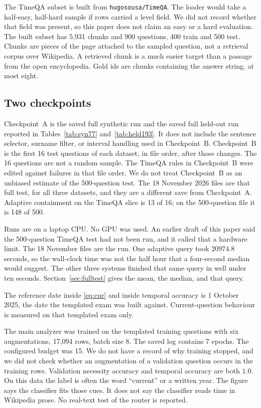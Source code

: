 \documentclass[11pt,letterpaper]{article}
\begin{document}
The TimeQA subset is built from \texttt{hugosousa/TimeQA}.
The loader would take a half-easy, half-hard sample if rows carried a level field.
We did not record whether that field was present, so this paper does not claim an easy or a hard evaluation.
The built subset has 5{,}931 chunks and 900 questions, 400 train and 500 test.
Chunks are pieces of the page attached to the sampled question, not a retrieval corpus over Wikipedia.
A retrieved chunk is a much easier target than a passage from the open encyclopedia.
Gold ids are chunks containing the answer string, at most eight.

\subsection{Two checkpoints}

Checkpoint~A is the saved full synthetic run and the saved full held-out run reported in Tables~\ref{tab:syn77} and~\ref{tab:held193}.
It does not include the sentence selector, surname filter, or interval handling used in Checkpoint~B.
Checkpoint~B is the first 16 test questions of each dataset, in file order, after those changes.
The 16 questions are not a random sample.
The TimeQA rules in Checkpoint~B were edited against failures in that file order.
We do not treat Checkpoint~B as an unbiased estimate of the 500-question test.
The 18 November 2026 files are that full test, for all three datasets, and they are a different save from Checkpoint~A.
Adaptive containment on the TimeQA slice is 13 of 16; on the 500-question file it is 148 of 500.

Runs are on a laptop CPU.
No GPU was used.
An earlier draft of this paper said the 500-question TimeQA test had not been run, and it called that a hardware limit.
The 18 November files are the run.
One adaptive query took $20974.8$ seconds, so the wall-clock time was not the half hour that a four-second median would suggest.
The other three systems finished that same query in well under ten seconds.
Section~\ref{sec:fulltest} gives the mean, the median, and that query.

The reference date inside \eqref{eq:cur} and inside temporal accuracy is 1 October 2025, the date the templated exam was built against.
Current-question behaviour is measured on that templated exam only.

The main analyzer was trained on the templated training questions with six augmentations, 17{,}094 rows, batch size 8.
The saved log contains 7 epochs.
The configured budget was 15.
We do not have a record of why training stopped, and we did not check whether an augmentation of a validation question occurs in the training rows.
Validation necessity accuracy and temporal accuracy are both $1.0$.
On this data the label is often the word ``current'' or a written year.
The figure says the classifier fits those cues.
It does not say the classifier reads time in Wikipedia prose.
No real-text test of the router is reported.
\end{document}
